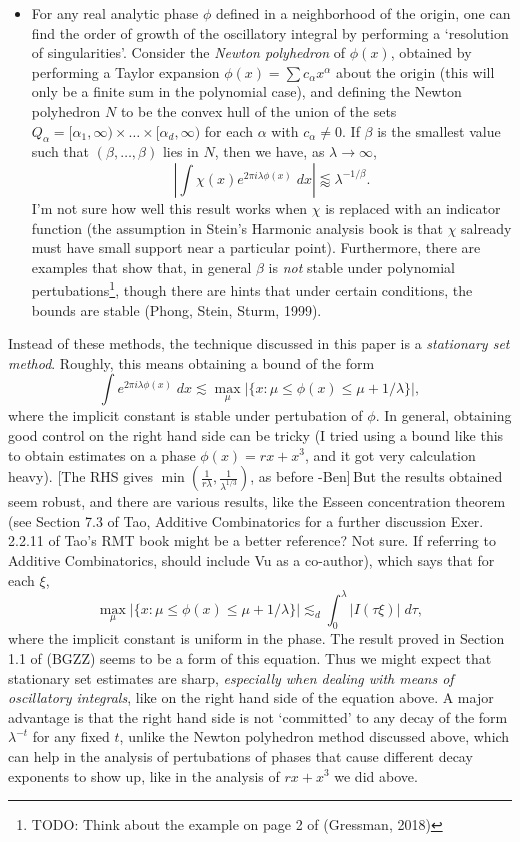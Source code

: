 \documentclass[12pt]{article}
\theoremstyle{definition}
\theoremstyle{remark}
\numberwithin{equation}{section}
\begin{document}
\begin{itemize}
		\item For any real analytic phase $\phi$ defined in a neighborhood of the origin, one can find the order of growth of the oscillatory integral by performing a `resolution of singularities'. Consider the \emph{Newton polyhedron} of $\phi(x)$, obtained by performing a Taylor expansion $\phi(x) = \sum c_\alpha x^\alpha$ about the origin (this will only be a finite sum in the polynomial case), and defining the Newton polyhedron $N$ to be the convex hull of the union of the sets $Q_\alpha = [\alpha_1, \infty) \times \dots \times [\alpha_d, \infty)$ for each $\alpha$ with $c_\alpha \neq 0$. If $\beta$ is the smallest value such that $(\beta,\dots,\beta)$ lies in $N$, then we have, as $\lambda \to \infty$,
		\[ \left| \int \chi(x) e^{2 \pi i \lambda \phi(x)}\; dx \right| \lessapprox \lambda^{-1/\beta}. \]
		I'm not sure how well this result works when $\chi$ is replaced with an indicator function (the assumption in Stein's Harmonic analysis book is that $\chi$ salready must have small support near a particular point). Furthermore, there are examples that show that, in general $\beta$ is \emph{not} stable under polynomial pertubations\footnote{TODO: Think about the example on page 2 of (Gressman, 2018)}, though there are hints that under certain conditions, the bounds are stable (Phong, Stein, Sturm, 1999).
	\end{itemize}
	Instead of these methods, the technique discussed in this paper is a \emph{stationary set method}. Roughly, this means obtaining a bound of the form
	\[ \int e^{2 \pi i \lambda \phi(x)}\; dx \lesssim \max_{\mu} \Big| \{ x : \mu \leq \phi(x) \leq \mu + 1/\lambda \} \Big|, \]
	where the implicit constant is stable under pertubation of $\phi$. In general, obtaining good control on the right hand side can be tricky (I tried using a bound like this to obtain estimates on a phase $\phi(x) = rx + x^3$, and it got very calculation heavy). {\color{red} [The RHS gives $\min(\frac{1}{r\lambda},\frac{1}{\lambda^{1/3}})$, as before -Ben]}\,But the results obtained seem robust, and there are various results, like the Esseen concentration theorem (see Section 7.3 of Tao, Additive Combinatorics for a further discussion {\color{red} Exer. 2.2.11 of Tao's RMT book might be a better reference? Not sure. If referring to Additive Combinatorics, should include Vu as a co-author}), which says that for each $\xi$,
	\[ \max_\mu \Big| \{ x : \mu \leq \phi(x) \leq \mu + 1/\lambda \} \Big| \lesssim_d \int_0^{\lambda} |I(\tau \xi)|\; d\tau, \]
	where the implicit constant is uniform in the phase. The result proved in Section 1.1 of (BGZZ) seems to be a form of this equation. Thus we might expect that stationary set estimates are sharp, \emph{especially when dealing with means of oscillatory integrals}, like on the right hand side of the equation above. A major advantage is that the right hand side is not `committed' to any decay of the form $\lambda^{-t}$ for any fixed $t$, unlike the Newton polyhedron method discussed above, which can help in the analysis of pertubations of phases that cause different decay exponents to show up, like in the analysis of $rx + x^3$ we did above.
\end{document}
